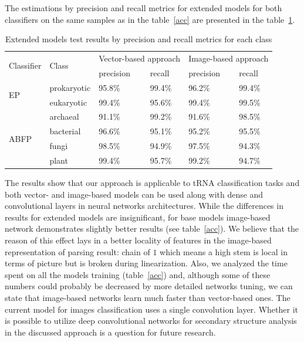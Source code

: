 \documentclass[runningheads]{llncs}
\begin{document}
The estimations by precision and recall metrics for extended models for both classifiers on the same samples as in the  table~\ref{acc} are presented in the table~\ref{pe}.

\begin{table}[h]
\centering
\caption{Extended models test results by precision and recall metrics for each class}
\begin{tabular}{|l||l|l|l|l|l|}
\hline
\multirow{2}{*}{Classifier} & \multirow{2}{*}{Class} & \multicolumn{2}{l|}{Vector-based approach} & \multicolumn{2}{l|}{Image-based approach} \\ \cline{3-6} 
                            &                        & precision         & recall        & precision        & recall        \\ \hline \hline
\multirow{2}{*}{EP}         & prokaryotic            & 95.8\%            & 99.4\%        & 96.2\%           & 99.4\%        \\ \cline{2-6} 
                            & eukaryotic             & 99.4\%            & 95.6\%        & 99.4\%           & 99.5\%        \\ \hline \hline
\multirow{4}{*}{ABFP}       & archaeal               & 91.1\%            & 99.2\%        & 91.6\%           & 98.5\%        \\ \cline{2-6} 
                            & bacterial              & 96.6\%            & 95.1\%        & 95.2\%           & 95.5\%        \\ \cline{2-6} 
                            & fungi                  & 98.5\%            & 94.9\%        & 97.5\%           & 94.3\%        \\ \cline{2-6} 
                            & plant                  & 99.4\%            & 95.7\%        & 99.2\%           & 94.7\%        \\ \hline
\end{tabular}
\label{pe}
\end{table}

The results show that our approach is applicable to tRNA classification tasks and both vector- and image-based models can be used along with dense and convolutional layers in neural networks architectures.
While the differences in results for extended models are insignificant, for base models image-based network demonstrates slightly better results (see table~\ref{acc}).
We believe that the reason of this effect lays in a better locality of features in the image-based representation of parsing result: chain of $1$ which means a high stem is local in terms of picture but is broken during linearization. 
Also, we analyzed the time spent on all the models training (table~\ref{acc}) and, although some of these numbers could probably be decreased by more detailed networks tuning, we can state that image-based networks learn much faster than vector-based ones.
The current model for images classification uses a single convolution layer.
Whether it is possible to utilize deep convolutional networks for secondary structure analysis in the discussed approach is a question for future research.
\end{document}
